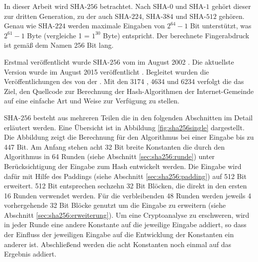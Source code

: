 In dieser Arbeit wird SHA-$256$ betrachtet. Nach SHA-$0$ und SHA-$1$ gehört dieser zur dritten Generation, zu der auch SHA-$224$, SHA-$384$ und SHA-$512$ gehören.
Genau wie SHA-$224$ werden maximale Eingaben von $ 2^{64} - 1$ Bit unterstützt, was $ 2^{61} - 1 $ Byte (vergleiche 1  = $ 1^{30} $ Byte) entspricht.
Der berechnete Fingerabdruck ist gemäß dem Namen 256 Bit lang.

Erstmal veröffentlicht wurde SHA-$256$ vom  im August 2002 \cite{nist1802}. Die aktuellste Version wurde im August 2015 veröffentlicht \cite{nist1804}.
Begleitet wurden die Veröffentlichungen des  von der . Mit den  3174 \cite{rfc3174}, 4634 \cite{rfc4634} und 6234 \cite{rfc6234}
verfolgt die  das Ziel, den Quellcode zur Berechnung der Hash-Algorithmen der Internet-Gemeinde auf eine einfache Art und Weise zur Verfügung zu stellen.

SHA-$256$ besteht aus mehreren Teilen die in den folgenden Abschnitten im Detail erläutert werden. Eine Übersicht ist in Abbildung \ref{fig:sha256single} dargestellt.
Die Abbildung zeigt die Berechnung für den Algorithmus bei einer Eingabe bis zu 447 Bit. Am Anfang stehen acht 32 Bit breite Konstanten die durch den Algorithmus
in 64 Runden (siehe Abschnitt \ref{sec:sha256:runde}) unter Berücksichtigung der Eingabe zum Hash entwickelt werden. Die Eingabe wird dafür mit Hilfe des Paddings
(siehe Abschnitt \ref{sec:sha256:padding}) auf 512 Bit erweitert. 512 Bit entsprechen sechzehn 32 Bit Blöcken, die direkt in den ersten 16 Runden verwendet werden.
Für die verbleibenden 48 Runden werden jeweils 4 vorhergehende 32 Bit Blöcke genutzt um die Eingabe zu erweitern (siehe Abschnitt \ref{sec:sha256:erweiterung}).
Um eine Cryptoanalyse zu erschweren, wird in jeder Runde eine andere Konstante auf die jeweilige Eingabe addiert, so dass der Einfluss der jeweiligen Eingabe
auf die Entwicklung der Konstanten ein anderer ist. Abschließend werden die acht Konstanten noch einmal auf das Ergebnis addiert.

